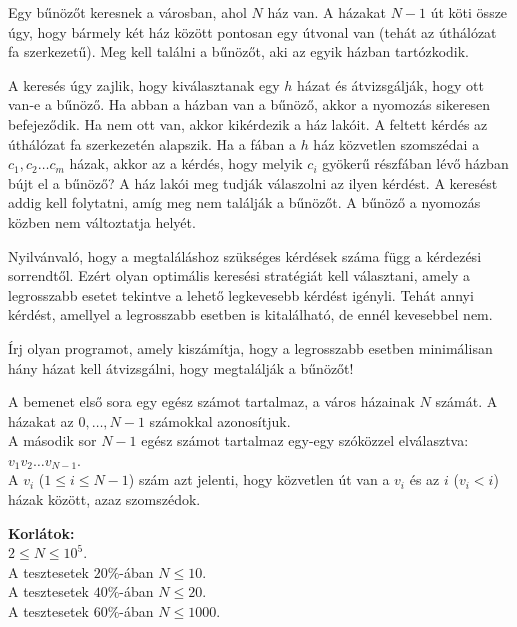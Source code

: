 





Egy bűnözőt keresnek a városban, ahol $N$ ház van. A házakat $N-1$ út köti össze úgy, hogy bármely két ház között pontosan egy útvonal van (tehát az úthálózat fa szerkezetű).
Meg kell találni a bűnözőt, aki az egyik házban tartózkodik.


A keresés úgy zajlik, hogy kiválasztanak egy $h$ házat és átvizsgálják, hogy ott van-e a bűnöző. Ha abban a házban van a bűnöző, akkor a nyomozás sikeresen befejeződik. Ha nem ott van, akkor kikérdezik a ház lakóit. A feltett kérdés az úthálózat fa szerkezetén alapszik. Ha a fában a $h$ ház közvetlen szomszédai a $c_1, c_2 \ldots c_m$ házak, akkor az a kérdés, hogy melyik $c_i$ gyökerű részfában lévő házban bújt el a bűnöző? A ház lakói meg tudják válaszolni az ilyen kérdést.
A keresést addig kell folytatni, amíg meg nem találják a bűnözőt. A bűnöző a nyomozás közben nem változtatja helyét.

Nyilvánvaló, hogy a megtaláláshoz szükséges kérdések száma függ a kérdezési sorrendtől.
Ezért olyan optimális keresési stratégiát kell választani, amely a legrosszabb esetet tekintve a lehető legkevesebb kérdést igényli. 
Tehát annyi kérdést, amellyel a legrosszabb esetben is kitalálható, de ennél kevesebbel nem.

Írj olyan programot, amely kiszámítja, hogy a legrosszabb esetben minimálisan hány házat kell átvizsgálni, hogy megtalálják a bűnözőt! 


A bemenet első sora egy egész számot tartalmaz, a város házainak $N$ számát. A házakat az $0, \ldots,N-1$ számokkal azonosítjuk.\\
A második sor $N-1$ egész számot tartalmaz egy-egy szóközzel elválasztva: $v_1 v_2 \ldots v_{N-1}$.\\
A $v_i$ ($1 \leq i \leq N-1$) szám azt jelenti, hogy közvetlen út van a $v_i$ és az $i$ ($v_i < i$) házak között, azaz szomszédok.

\smallskip
\noindent \textbf{Korlátok:}\\
$2 \leq N \leq 10^5$.\\
A tesztesetek $20\%$-ában  $N \leq 10$.\\
A tesztesetek $40\%$-ában   $N \leq 20$.\\
A tesztesetek $60\%$-ában   $N \leq 1000$.

